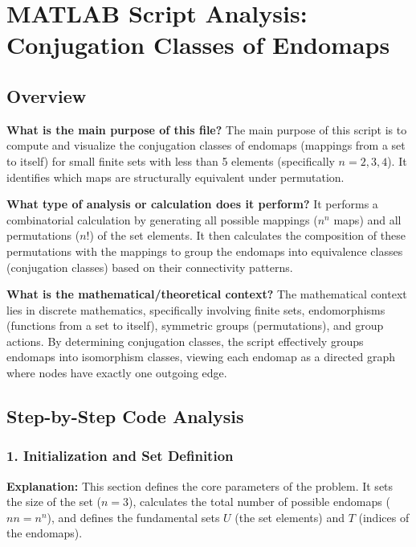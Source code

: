 
\chapter{MATLAB Script Analysis: Conjugation Classes of Endomaps}
\author{Expert Software Engineer}
\date{}

\maketitle

\section{Overview}

\textbf{What is the main purpose of this file?}
The main purpose of this script is to compute and visualize the conjugation classes of endomaps (mappings from a set to itself) for small finite sets with less than 5 elements (specifically $n=2, 3, 4$). It identifies which maps are structurally equivalent under permutation.

\textbf{What type of analysis or calculation does it perform?}
It performs a combinatorial calculation by generating all possible mappings ($n^n$ maps) and all permutations ($n!$) of the set elements. It then calculates the composition of these permutations with the mappings to group the endomaps into equivalence classes (conjugation classes) based on their connectivity patterns. 

\textbf{What is the mathematical/theoretical context?}
The mathematical context lies in discrete mathematics, specifically involving finite sets, endomorphisms (functions from a set to itself), symmetric groups (permutations), and group actions. By determining conjugation classes, the script effectively groups endomaps into isomorphism classes, viewing each endomap as a directed graph where nodes have exactly one outgoing edge.

\section{Step-by-Step Code Analysis}

\subsection{1. Initialization and Set Definition}
\textbf{Explanation:} This section defines the core parameters of the problem. It sets the size of the set ($n=3$), calculates the total number of possible endomaps ($nn = n^n$), and defines the fundamental sets $U$ (the set elements) and $T$ (indices of the endomaps). 

